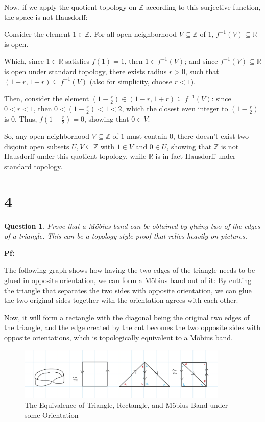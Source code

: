\documentclass{article}
\newtheorem{question}{Question}
\begin{document}
\hfill

Now, if we apply the quotient topology on $\mathbb{Z}$ according to this surjective function, the space is not Hausdorff:

Consider the element $1\in\mathbb{Z}$. For all open neighborhood $V\subseteq \mathbb{Z}$ of $1$, $f^{-1}(V)\subseteq \mathbb{R}$ is open.

Which, since $1\in\mathbb{R}$ satisfies $f(1)=1$, then $1\in f^{-1}(V)$; and since $f^{-1}(V)\subseteq \mathbb{R}$ is open under standard topology,
there exists radius $r>0$, such that $(1-r,1+r)\subseteq f^{-1}(V)$ (also for simplicity, choose $r<1$).

Then, consider the element $(1-\frac{r}{2})\in (1-r,1+r)\subseteq f^{-1}(V)$: since $0<r<1$, then $0<(1-\frac{r}{2})<1<2$, which the closest even integer to $(1-\frac{r}{2})$ is $0$.
Thus, $f(1-\frac{r}{2})=0$, showing that $0\in V$.

So, any open neighborhood $V\subseteq \mathbb{Z}$ of $1$ must contain $0$, there doesn't exist two disjoint open subsets $U,V\subseteq \mathbb{Z}$
with $1\in V$ and $0\in U$, showing that $\mathbb{Z}$ is not Hausdorff under this quotient topology, while $\mathbb{R}$ is in fact Hausdorff under standard topology.

\hfill

\hfill

\section*{4}
\begin{myBox}[]{}
    \begin{question}
        Prove that a Möbius band can be obtained by gluing two of the edges of a
        triangle. This can be a topology-style proof that relies heavily on pictures.
    \end{question}
\end{myBox}

\textbf{Pf:}

The following graph shows how having the two edges of the triangle needs to be glued in opposite orientation, 
we can form a Möbius band out of it: By cutting the triangle that separates the two sides with opposite orientation,
we can glue the two original sides together with the orientation agrees with each other.

Now, it will form a rectangle with the diagonal being the original two edges of the triangle, 
and the edge created by the cut becomes the two opposite sides with opposite orientations, whch is topologically equivalent
to a Möbius band.

\begin{figure}[h!]
    \begin{center}
        \includegraphics*[width=100mm]{mobius.jpg}
        \caption{The Equivalence of Triangle, Rectangle, and Möbius Band under some Orientation}
    \end{center}
\end{figure}
\end{document}
